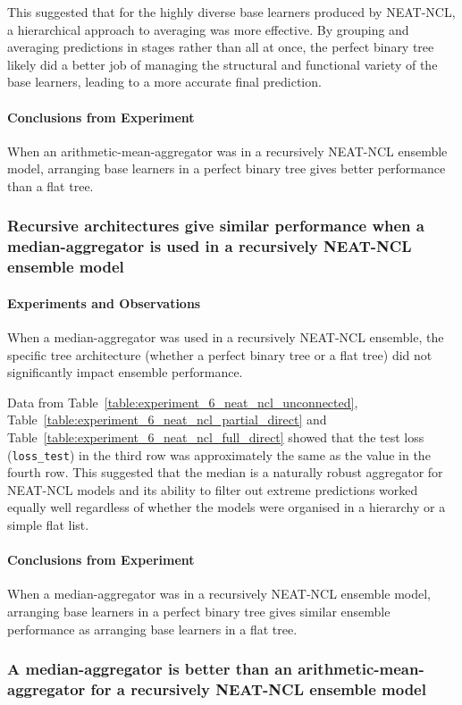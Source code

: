 \documentclass{article}
\begin{document}
This suggested that for the highly diverse base learners produced by NEAT-NCL, a hierarchical approach to averaging was more effective. By grouping and averaging predictions in stages rather than all at once, the perfect binary tree likely did a better job of managing the structural and functional variety of the base learners, leading to a more accurate final prediction. 

\paragraph{Conclusions from Experiment}
When an arithmetic-mean-aggregator was in a recursively NEAT-NCL ensemble model, arranging base learners in a perfect binary tree gives better performance than a flat tree. 


\subsubsection{Recursive architectures give similar performance when a median-aggregator is used in a recursively NEAT-NCL ensemble model}
\paragraph{Experiments and Observations}
When a median-aggregator was used in a recursively NEAT-NCL ensemble, the specific tree architecture (whether a perfect binary tree or a flat tree) did not significantly impact ensemble performance. 

Data from Table~\ref{table:experiment_6_neat_ncl_unconnected}, Table~\ref{table:experiment_6_neat_ncl_partial_direct} and Table~\ref{table:experiment_6_neat_ncl_full_direct} showed that the test loss (\texttt{loss\_test}) in the third row was approximately the same as the value in the fourth row. This suggested that the median is a naturally robust aggregator for NEAT-NCL models and its ability to filter out extreme predictions worked equally well regardless of whether the models were organised in a hierarchy or a simple flat list. 

\paragraph{Conclusions from Experiment}
When a median-aggregator was in a recursively NEAT-NCL ensemble model, arranging base learners in a perfect binary tree gives similar ensemble performance as arranging base learners in a flat tree. 


\subsubsection{A median-aggregator is better than an arithmetic-mean-aggregator for a recursively NEAT-NCL ensemble model}
\end{document}

